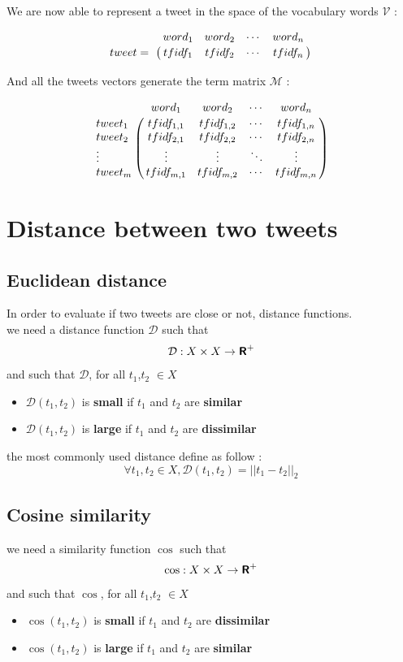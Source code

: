 \documentclass[a4paper,12pt]{report}
\begin{document}
We are now able to represent a tweet in the space of the vocabulary words $\mathcal{V}$ :

\[
\bordermatrix{~ & word_1 & word_2 & \cdots & word_n \cr tweet =  & tfidf_1 & tfidf_2 & \cdots & tfidf_n \cr}
\]

And all the tweets vectors generate the term matrix $\mathcal{M}$ :

\[
\bordermatrix{
~ & word_1 & word_2 & \cdots & word_n \cr 
tweet_1 & tfidf_{1,1} & tfidf_{1,2} & \cdots & tfidf_{1,n} \cr
tweet_2 & tfidf_{2,1} & tfidf_{2,2} & \cdots & tfidf_{2,n} \cr
\vdots & \vdots & \vdots & \ddots & \vdots \cr
tweet_m & tfidf_{m,1} & tfidf_{m,2} & \cdots & tfidf_{m,n} \cr
}
\]

\newpage

\section{Distance between two tweets}

\subsection{Euclidean distance}
In order to evaluate if two tweets are close or not, distance functions.\\
we need a distance function $\mathcal{D}$ such that
$$ \mathcal{D} : X\times X \rightarrow \textbf{\textsf{R}}^+ $$
and such that $\mathcal{D}$, for all $t_1$,$t_2$ $\in X$
\begin{itemize}
\item $\mathcal{D}(t_1,t_2)$ is \textbf{small} if $t_1$ and $t_2$ are \textbf{similar}
\item $\mathcal{D}(t_1,t_2)$ is \textbf{large} if $t_1$ and $t_2$ are \textbf{dissimilar}
\end{itemize}
the most commonly used distance define as follow :
$$ \forall t_1,t_2 \in X, \mathcal{D}(t_1,t_2) = || t_1 - t_2 ||_2 $$


\subsection{Cosine similarity}

we need a similarity function $\cos$ such that
$$ \cos : X\times X \rightarrow \textbf{\textsf{R}}^+ $$
and such that $\cos$, for all $t_1$,$t_2$ $\in X$
\begin{itemize}
\item $\cos(t_1,t_2)$ is \textbf{small} if $t_1$ and $t_2$ are \textbf{dissimilar}
\item $\cos(t_1,t_2)$ is \textbf{large} if $t_1$ and $t_2$ are \textbf{similar}
\end{itemize}
\end{document}
